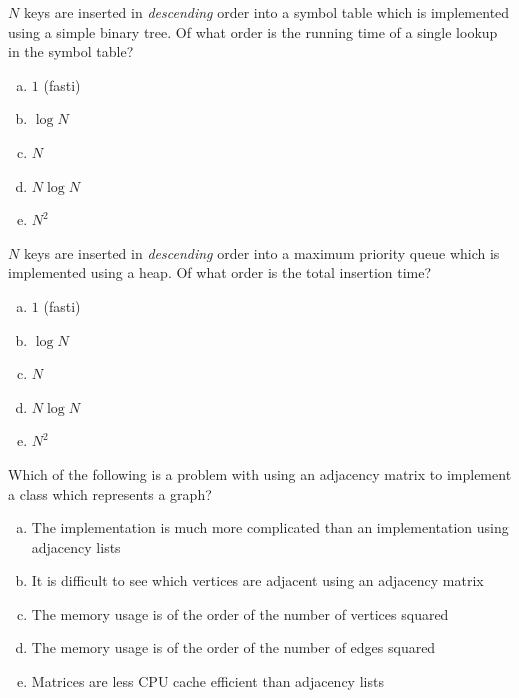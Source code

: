 \documentclass[addpoints]{exam}
\begin{document}
\begin{questions}
	\question[3]

	$N$ keys are inserted in \emph{descending} order into a symbol table which is implemented using a simple binary tree. Of what order is the running time of a single lookup in the symbol table?

	\begin{multicols}{5}
		\begin{enumerate}[a)]
			\item $1$ (fasti)
			\item $\log N$
			\item $N$
			\item $N\log N$
			\item $N^2$
		\end{enumerate}
	\end{multicols}

	\question[3]

	$N$ keys are inserted in \emph{descending} order into a maximum priority queue which is implemented using a heap. Of what order is the total insertion time?

	\begin{multicols}{5}
		\begin{enumerate}[a)]
			\item $1$ (fasti)
			\item $\log N$
			\item $N$
			\item $N\log N$
			\item $N^2$
		\end{enumerate}
	\end{multicols}

	\question[3]

	Which of the following is a problem with using an adjacency matrix to implement a class which represents a graph?

	\begin{enumerate}[a)]
		\item The implementation is much more complicated than an implementation using adjacency lists
		\item It is difficult to see which vertices are adjacent using an adjacency matrix
		\item The memory usage is of the order of the number of vertices squared
		\item The memory usage is of the order of the number of edges squared
		\item Matrices are less CPU cache efficient than adjacency lists
	\end{enumerate}


\end{questions}
\end{document}
